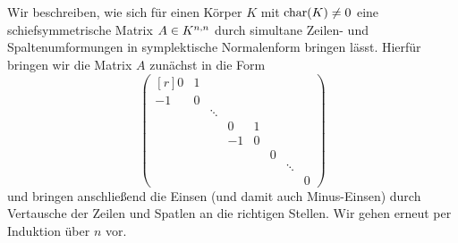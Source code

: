 \section{}





\addtocounter{subsection}{1}
\subsection{}

Wir beschreiben, wie sich für einen Körper $K$ mit $\ringchar(K) \neq 0$ eine schiefsymmetrische Matrix $A \in \matrices{n}{K}$ durch simultane Zeilen- und Spaltenumformungen in symplektische Normalenform bringen lässt.
Hierfür bringen wir die Matrix $A$ zunächst in die Form
\[
  \begin{pmatrix*}[r]
     0  & 1 &         &     &   &   &         &   \\
    -1  & 0 &         &     &   &   &         &   \\
        &   & \ddots  &     &   &   &         &   \\
        &   &         &  0  & 1 &   &         &   \\
        &   &         & -1  & 0 &   &         &   \\
        &   &         &     &   & 0 &         &   \\
        &   &         &     &   &   & \ddots  &   \\
        &   &         &     &   &   &         & 0
  \end{pmatrix*}
\]
und bringen anschließend die Einsen (und damit auch Minus-Einsen) durch Vertausche der Zeilen und Spatlen an die richtigen Stellen.
Wir gehen erneut per Induktion über $n$ vor.

